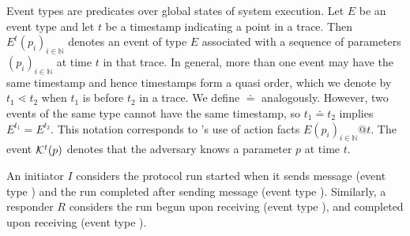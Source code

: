 Event types are predicates over global states of system execution.
%
Let $E$ be an event type and let $t$ be a timestamp indicating a point in a
trace.
%
Then $E^{t}(p_i)_{i\in\mathbb{N}}$ denotes an event of type $E$ associated with a sequence of parameters
$(p_i)_{i\in\mathbb{N}}$ at time $t$ in that trace.
%
In general, more than one event may have the same timestamp and hence
timestamps form a quasi order, which we denote by $t_1 \lessdot t_2$ when $t_1$
is before $t_2$ in a trace.
%
We define $\doteq$ analogously.
%
However, two events of the same type cannot have the same timestamp, so
$t_1 \doteq t_2$ implies $E^{t_1} = E^{t_2}$.
%
This notation corresponds to \mTamarin{}'s use of action facts
$E(p_i)_{i\in\mathbb{N}}@t$.
%
%
%
%
The event $\mathcal{K}^t(p)$ denotes that the adversary knows a parameter $p$ at
time $t$.
%
%

An initiator $I$ considers the
protocol run started when it sends message \mMsgone{} (event type \mIStart)
and the run completed after sending message \mMsgthree{} (event type
\mIComplete).
%
%
Similarly, a responder $R$ considers the run begun upon receiving
\mMsgone{} (event type \mRStart), and completed upon receiving \mMsgthree{}
(event type \mRComplete). \\
%
%
%

